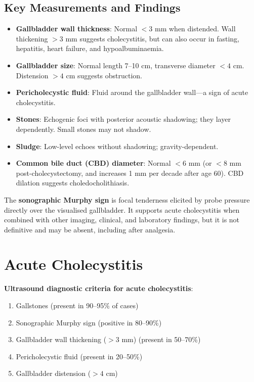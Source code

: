 \subsection{Key Measurements and Findings}
\begin{itemize}
  \item \textbf{Gallbladder wall thickness}: Normal $< 3$ mm when distended. Wall thickening $> 3$ mm suggests cholecystitis, but can also occur in fasting, hepatitis, heart failure, and hypoalbuminaemia.
  \item \textbf{Gallbladder size}: Normal length 7--10 cm, transverse diameter $< 4$ cm. Distension $> 4$ cm suggests obstruction.
  \item \textbf{Pericholecystic fluid}: Fluid around the gallbladder wall---a sign of acute cholecystitis.
  \item \textbf{Stones}: Echogenic foci with posterior acoustic shadowing; they layer dependently. Small stones may not shadow.
  \item \textbf{Sludge}: Low-level echoes without shadowing; gravity-dependent.
  \item \textbf{Common bile duct (CBD) diameter}: Normal $< 6$ mm (or $< 8$ mm post-cholecystectomy, and increases 1 mm per decade after age 60). CBD dilation suggests choledocholithiasis.
\end{itemize}

\begin{pearlbox}
The \textbf{sonographic Murphy sign} is focal tenderness elicited by probe pressure directly over the visualised gallbladder. It supports acute cholecystitis when combined with other imaging, clinical, and laboratory findings, but it is not definitive and may be absent, including after analgesia.
\end{pearlbox}


\section{Acute Cholecystitis}
\textbf{Ultrasound diagnostic criteria for acute cholecystitis}:
\begin{enumerate}
  \item Gallstones (present in 90--95\% of cases)
  \item Sonographic Murphy sign (positive in 80--90\%)
  \item Gallbladder wall thickening ($> 3$ mm) (present in 50--70\%)
  \item Pericholecystic fluid (present in 20--50\%)
  \item Gallbladder distension ($> 4$ cm)
\end{enumerate}


